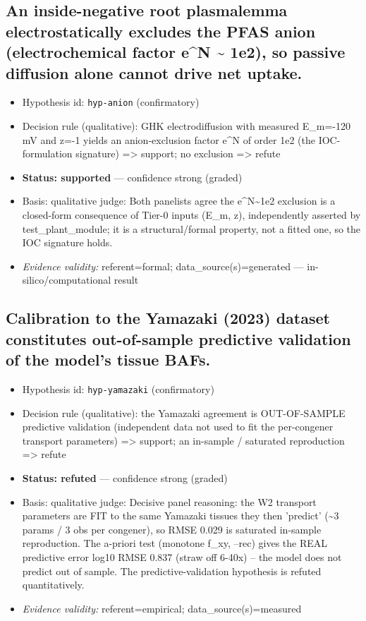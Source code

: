 \documentclass{article}
\begin{document}
\subsection{An inside-negative root plasmalemma electrostatically excludes the PFAS anion (electrochemical factor e\textasciicircum{}N \textasciitilde{} 1e2), so passive diffusion alone cannot drive net uptake.}
\begin{itemize}
  \item Hypothesis id: \texttt{hyp-anion} (confirmatory)
  \item Decision rule (qualitative): GHK electrodiffusion with measured E\_m=-120 mV and z=-1 yields an anion-exclusion factor e\textasciicircum{}N of order 1e2 (the IOC-formulation signature) => support; no exclusion => refute
  \item \textbf{Status: supported} --- confidence strong (graded)
  \item Basis: qualitative judge: Both panelists agree the e\textasciicircum{}N\textasciitilde{}1e2 exclusion is a closed-form consequence of Tier-0 inputs (E\_m, z), independently asserted by test\_plant\_module; it is a structural/formal property, not a fitted one, so the IOC signature holds.
  \item \textit{Evidence validity:} referent=formal; data\_source(s)=generated --- in-silico/computational result
\end{itemize}

\subsection{Calibration to the Yamazaki (2023) dataset constitutes out-of-sample predictive validation of the model's tissue BAFs.}
\begin{itemize}
  \item Hypothesis id: \texttt{hyp-yamazaki} (confirmatory)
  \item Decision rule (qualitative): the Yamazaki agreement is OUT-OF-SAMPLE predictive validation (independent data not used to fit the per-congener transport parameters) => support; an in-sample / saturated reproduction => refute
  \item \textbf{Status: refuted} --- confidence strong (graded)
  \item Basis: qualitative judge: Decisive panel reasoning: the W2 transport parameters are FIT to the same Yamazaki tissues they then 'predict' (\textasciitilde{}3 params / 3 obs per congener), so RMSE 0.029 is saturated in-sample reproduction. The a-priori test (monotone f\_xy, --rec) gives the REAL predictive error log10 RMSE 0.837 (straw off 6-40x) -- the model does not predict out of sample. The predictive-validation hypothesis is refuted quantitatively.
  \item \textit{Evidence validity:} referent=empirical; data\_source(s)=measured
\end{itemize}
\end{document}
